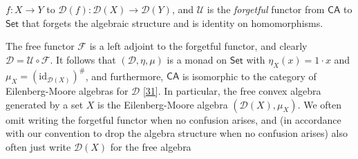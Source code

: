 \hypertarget{html:S5.SS0.SSS0.P0.SPx2.p1.m10}{}\({f\colon X\to Y}\) to %
\hypertarget{html:S5.SS0.SSS0.P0.SPx2.p1.m11}{}\({{\mathcal{D}}(f)\colon{\mathcal{D}}(X)\to{\mathcal{D}}(Y)}\), and %
\hypertarget{html:S5.SS0.SSS0.P0.SPx2.p1.m12}{}\({{\mathcal{U}}}\) is the \emph{forgetful} functor from %
\hypertarget{html:S5.SS0.SSS0.P0.SPx2.p1.m13}{}\({\mathsf{CA}}\) to %
\hypertarget{html:S5.SS0.SSS0.P0.SPx2.p1.m14}{}\({\mathsf{Set}}\) that forgets the algebraic structure and is identity on homomorphisms.
\par\medskip
\hypertarget{html:S5.SS0.SSS0.P0.SPx2.p2}{} The free functor %
\hypertarget{html:S5.SS0.SSS0.P0.SPx2.p2.m1}{}\({\mathcal{F}}\) is a left adjoint to the forgetful functor, and clearly %
\hypertarget{html:S5.SS0.SSS0.P0.SPx2.p2.m2}{}\({{\mathcal{D}}={\mathcal{U}}\circ{\mathcal{F}}}\). It follows that %
\hypertarget{html:S5.SS0.SSS0.P0.SPx2.p2.m3}{}\({({\mathcal{D}},\eta,\mu)}\) is a monad on %
\hypertarget{html:S5.SS0.SSS0.P0.SPx2.p2.m4}{}\({\mathsf{Set}}\) with %
\hypertarget{html:S5.SS0.SSS0.P0.SPx2.p2.m5}{}\({\eta_{X}(x)=1\cdot x}\) and %
\hypertarget{html:S5.SS0.SSS0.P0.SPx2.p2.m6}{}\({\mu_{X}=(\mathrm{id}_{{\mathcal{D}}(X)})^{\#}}\), and furthermore, %
\hypertarget{html:S5.SS0.SSS0.P0.SPx2.p2.m7}{}\({\mathsf{CA}}\) is isomorphic to the category of Eilenberg-Moore algebras for %
\hypertarget{html:S5.SS0.SSS0.P0.SPx2.p2.m8}{}\({{\mathcal{D}}}\) [\hyperlink{html:bib.bib31}{31}]. In particular, the free convex algebra generated by a set %
\hypertarget{html:S5.SS0.SSS0.P0.SPx2.p2.m9}{}\({X}\) is the Eilenberg-Moore algebra %
\hypertarget{html:S5.SS0.SSS0.P0.SPx2.p2.m10}{}\({({\mathcal{D}}(X),\mu_{X})}\). We often omit writing the forgetful functor when no confusion arises, and (in accordance with our convention to drop the algebra structure when no confusion arises) also often just write %
\hypertarget{html:S5.SS0.SSS0.P0.SPx2.p2.m11}{}\({{\mathcal{D}}(X)}\) for the free algebra %
